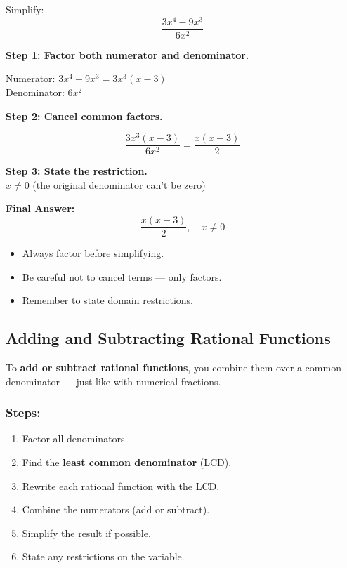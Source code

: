 \documentclass[11pt]{article}
\begin{document}
\begin{example}
Simplify:
\[
\frac{3x^4 - 9x^3}{6x^2}
\]

\textbf{Step 1: Factor both numerator and denominator.}

Numerator: \( 3x^4 - 9x^3 = 3x^3(x - 3) \) \\
Denominator: \( 6x^2 \)

\textbf{Step 2: Cancel common factors.}

\[
\frac{3x^3(x - 3)}{6x^2} = \frac{x(x - 3)}{2}
\]

\textbf{Step 3: State the restriction.} \\
\( x \neq 0 \) (the original denominator can't be zero)

\textbf{Final Answer:}
\[
\frac{x(x - 3)}{2}, \quad x \neq 0
\]
\end{example}

\begin{tcolorbox}[colback=blue!5!white, colframe=blue!80!black, title=Tips]
\begin{itemize}
  \item Always factor before simplifying.
  \item Be careful not to cancel terms — only factors.
  \item Remember to state domain restrictions.
\end{itemize}
\end{tcolorbox}

\subsection{Adding and Subtracting Rational Functions}

To \textbf{add or subtract rational functions}, you combine them over a common denominator — just like with numerical fractions.

\subsubsection*{Steps:}
\begin{enumerate}
  \item Factor all denominators.
  \item Find the \textbf{least common denominator} (LCD).
  \item Rewrite each rational function with the LCD.
  \item Combine the numerators (add or subtract).
  \item Simplify the result if possible.
  \item State any restrictions on the variable.
\end{enumerate}
\end{document}
